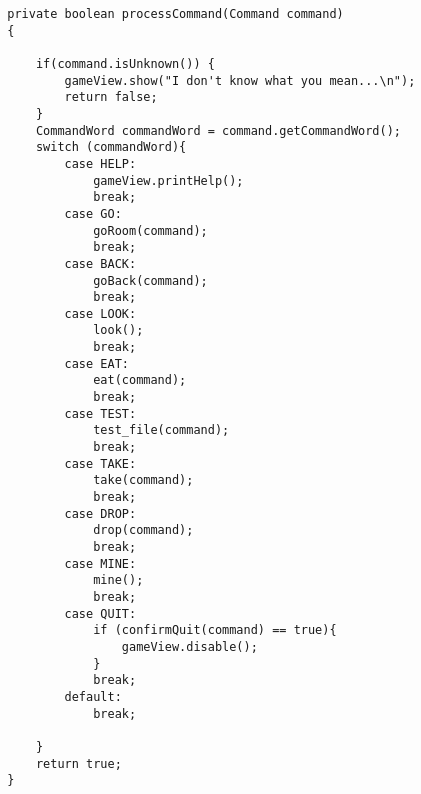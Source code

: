 \documentclass[a4paper , 10pt]{article}
\begin{document}
\begin{verbatim}
        private boolean processCommand(Command command) 
        {
    
            if(command.isUnknown()) {
                gameView.show("I don't know what you mean...\n");
                return false;
            }
            CommandWord commandWord = command.getCommandWord();
            switch (commandWord){
                case HELP:
                    gameView.printHelp();
                    break;
                case GO:
                    goRoom(command);
                    break;
                case BACK:
                    goBack(command);
                    break;
                case LOOK:
                    look();
                    break;
                case EAT:
                    eat(command);
                    break;
                case TEST:
                    test_file(command);
                    break;
                case TAKE:
                    take(command);
                    break;
                case DROP:
                    drop(command);
                    break;
                case MINE:
                    mine();
                    break;
                case QUIT:
                    if (confirmQuit(command) == true){
                        gameView.disable();
                    }
                    break;
                default:
                    break;
    
            }
            return true;
        } 
\end{verbatim}
\end{document}
